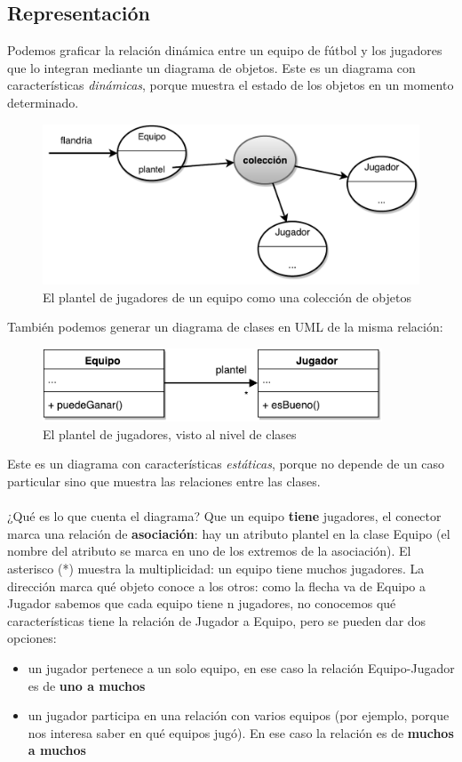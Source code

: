 \documentclass[a4paper,12pt]{book}
\begin{document}
\subsection{Representación}
Podemos graficar la relación dinámica entre un equipo de fútbol y los jugadores que lo integran mediante un diagrama
de objetos. Este es un diagrama con características \textit{dinámicas}, porque muestra el estado 
de los objetos en un momento determinado.
\\
\begin{figure}[h!]
    \centering
    \includegraphics[width=1.1\textwidth]{images/02_Equipo_Coleccion.pdf}
    \caption{El plantel de jugadores de un equipo como una colección de objetos}
\end{figure}
\FloatBarrier
También podemos generar un diagrama de clases en UML de la misma relación:
\begin{figure}[h!]
    \centering	
    \includegraphics[width=0.9\textwidth]{images/03_Diagrama_Clases_Equipo.pdf}
    \caption{El plantel de jugadores, visto al nivel de clases}
\end{figure}
\FloatBarrier
Este es un diagrama con características \textit{estáticas}, porque no depende de un caso particular
sino que muestra las relaciones entre las clases.\\
\\
¿Qué es lo que cuenta el diagrama? Que un equipo \textbf{tiene} jugadores, el conector marca una relación
de \textbf{asociación}: hay un atributo plantel en la clase Equipo (el nombre del atributo se marca en uno
de los extremos de la asociación). El asterisco (*) muestra la multiplicidad: un equipo tiene muchos jugadores.
La dirección marca qué objeto conoce a los otros: como la flecha va de Equipo a Jugador sabemos que cada equipo
tiene n jugadores, no conocemos qué características tiene la relación de Jugador a Equipo, pero se pueden dar
dos opciones:
\begin{itemize}
\item un jugador pertenece a un solo equipo, en ese caso la relación Equipo-Jugador es de \textbf{uno a muchos}
\item un jugador participa en una relación con varios equipos (por ejemplo, porque nos interesa saber
en qué equipos jugó). En ese caso la relación es de \textbf{muchos a muchos}
\end{itemize}
\end{document}
